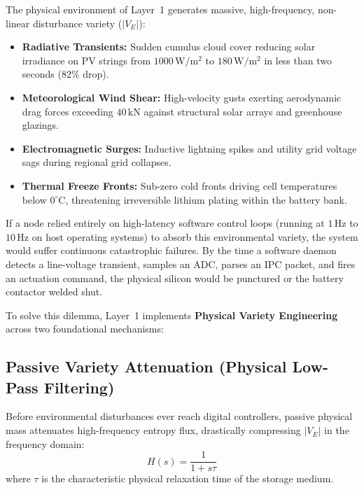 The physical environment of Layer~1 generates massive, high-frequency, non-linear disturbance variety ($|V_E|$):
\begin{itemize}
    \item \textbf{Radiative Transients:} Sudden cumulus cloud cover reducing solar irradiance on PV strings from $1000\,\mathrm{W/m^2}$ to $180\,\mathrm{W/m^2}$ in less than two seconds ($82\%$ drop).
    \item \textbf{Meteorological Wind Shear:} High-velocity gusts exerting aerodynamic drag forces exceeding $40\,\mathrm{kN}$ against structural solar arrays and greenhouse glazings.
    \item \textbf{Electromagnetic Surges:} Inductive lightning spikes and utility grid voltage sags during regional grid collapses.
    \item \textbf{Thermal Freeze Fronts:} Sub-zero cold fronts driving cell temperatures below $0^\circ\mathrm{C}$, threatening irreversible lithium plating within the battery bank.
\end{itemize}

If a node relied entirely on high-latency software control loops (running at $1\,\mathrm{Hz}$ to $10\,\mathrm{Hz}$ on host operating systems) to absorb this environmental variety, the system would suffer continuous catastrophic failures. By the time a software daemon detects a line-voltage transient, samples an ADC, parses an IPC packet, and fires an actuation command, the physical silicon would be punctured or the battery contactor welded shut.

To solve this dilemma, Layer~1 implements \textbf{Physical Variety Engineering} across two foundational mechanisms:

\subsection{Passive Variety Attenuation (Physical Low-Pass Filtering)}
Before environmental disturbances ever reach digital controllers, passive physical mass attenuates high-frequency entropy flux, drastically compressing $|V_E|$ in the frequency domain:
\begin{equation}
H(s) = \frac{1}{1 + s \tau}
\label{eq:low_pass_filter_transfer}
\end{equation}
where $\tau$ is the characteristic physical relaxation time of the storage medium.

